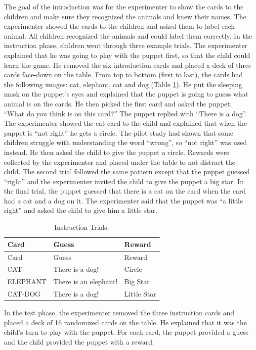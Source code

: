 \documentclass[floatsintext,man]{apa6}
\theoremstyle{definition}
\theoremstyle{definition}
\theoremstyle{definition}
\theoremstyle{remark}
\begin{document}
The goal of the introduction was for the experimenter to show the cards
to the children and make sure they recognized the animals and knew their
names. The experimenter showed the cards to the children and asked them
to label each animal. All children recognized the animals and could
label them correctly. In the instruction phase, children went through
three example trials. The experimenter explained that he was going to
play with the puppet first, so that the child could learn the game. He
removed the six introduction cards and placed a deck of three cards
face-down on the table. From top to bottom (first to last), the cards
had the following images: cat, elephant, cat and dog (Table
\ref{tab:instruction}). He put the sleeping mask on the puppet's eyes
and explained that the puppet is going to guess what animal is on the
cards. He then picked the first card and asked the puppet: \enquote{What
do you think is on this card?} The puppet replied with \enquote{There is
a dog}. The experimenter showed the cat-card to the child and explained
that when the puppet is \enquote{not right} he gets a circle. The pilot
study had shown that some children struggle with understanding the word
\enquote{wrong}, so \enquote{not right} was used instead. He then asked
the child to give the puppet a circle. Rewards were collected by the
experimenter and placed under the table to not distract the child. The
second trial followed the same pattern except that the puppet guessed
\enquote{right} and the experimenter invited the child to give the
puppet a big star. In the final trial, the puppet guessed that there is
a cat on the card when the card had a cat and a dog on it. The
experimenter said that the puppet was \enquote{a little right} and asked
the child to give him a little star.

\begin{longtable}[]{@{}lll@{}}
\caption{\label{tab:instruction} Instruction Trials.}\tabularnewline
\toprule
Card & Guess & Reward\tabularnewline
\midrule
\endfirsthead
\toprule
Card & Guess & Reward\tabularnewline
\midrule
\endhead
CAT & There is a dog! & Circle\tabularnewline
ELEPHANT & There is an elephant! & Big Star\tabularnewline
CAT-DOG & There is a dog! & Little Star\tabularnewline
\bottomrule
\end{longtable}

In the test phase, the experimenter removed the three instruction cards
and placed a deck of 16 randomized cards on the table. He explained that
it was the child's turn to play with the puppet. For each card, the
puppet provided a guess and the child provided the puppet with a reward.
\end{document}
